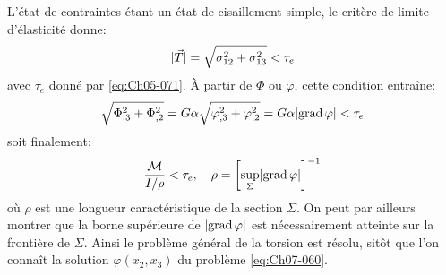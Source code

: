 L'état de contraintes étant un état de cisaillement simple, le critère de limite d'élasticité donne: 
\begin{equation}
    \lvert\vec{T}\rvert = \sqrt{\sigma_{12}^2 + \sigma_{13}^2} < \tau_e    
    \label{eq:Ch07-067}
\end{equation}
avec $\tau_e$ donné par \eqref{eq:Ch05-071}.
\`A partir de $\Phi$ ou $\varphi$, cette condition entraîne: 
\begin{equation}
\sqrt{\Phi_{,3}^2 + \Phi_{,2}^2} = G \alpha \sqrt{\varphi_{,3}^2 + \varphi_{,2}^2} = G \alpha \lvert\operatorname*{\mathrm{grad}} \varphi\rvert < \tau_e
\end{equation}
soit finalement:
\begin{equation}
    \frac{\mathcal{M}}{I/\rho} < \tau_e, \quad \rho = \left[ \sup_{\Sigma} \lvert\operatorname*{\mathrm{grad}} \varphi\rvert \right]^{-1}
    \label{eq:Ch07-068}
\end{equation}
où $\rho$ est une longueur caractéristique de la section $\Sigma$.
On peut par ailleurs montrer que la borne supérieure de $\lvert\operatorname*{\mathrm{grad}} \varphi\rvert$ est nécessairement atteinte sur la frontière de $\Sigma$.
Ainsi le problème général de la torsion est résolu, sitôt que l'on connaît la solution $\varphi\left( x_2,x_3 \right)$ du problème \eqref{eq:Ch07-060}. 

